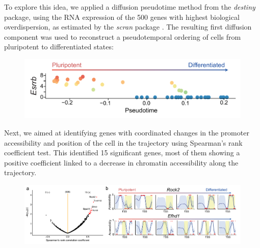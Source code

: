 To explore this idea, we applied a diffusion pseudotime method from the \textit{destiny} package\cite{Haghverdi2016}, using the RNA expression of the 500 genes with highest biological overdispersion, as estimated by the \textit{scran} package \cite{Lun2016}. The resulting first diffusion component was used to reconstruct a pseudotemporal ordering of cells from pluripotent to differentiated states:

\begin{figure}[H]
	\centering
	\includegraphics[width=0.9\linewidth]{scNMT_pseudotime}
	\caption[]{}
	\label{fig:scnmt_pseudotime}
\end{figure}


Next, we aimed at identifying genes with coordinated changes in the promoter accessibility and position of the cell in the trajectory using Spearman’s rank coefficient test. This identified 15 significant genes, most of them showing a positive coefficient linked to a decrease in chromatin accessibility along the trajectory.

\begin{figure}[H]
	\centering
	\includegraphics[width=0.9\linewidth]{scNMT_pseudotime_correlation}
	\caption[]{}
	\label{fig:scnmt_pseudotime_correlation}
\end{figure}



